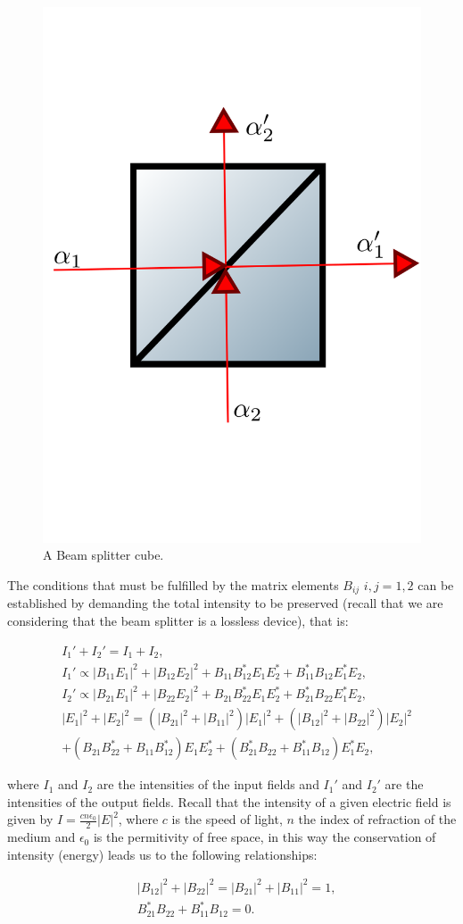 \documentclass[12pt]{book}
\begin{document}
\begin{figure}[t!]
\centering
\includegraphics[width=5 cm,height=5 cm]{images/bS.png}
\caption{A Beam splitter cube.}
\label{fig:BS}
\end{figure}

The conditions  that must be fulfilled by the matrix elements $B_{ij}$  $i,j=1,2$  can be established by demanding the total intensity to be preserved (recall that we are considering that the beam splitter is a lossless device), that is:

\begin{align}
&I_{1}'+I_{2}'=I_{1}+I_{2}, \\
&I_{1}'\propto|B_{11} E_{1}|^{2}+|B_{12} E_{2}|^{2}+B_{11} B_{12}^{*} E_{1} E_{2}^{*}+B_{11}^{*} B_{12} E_{1}^{*} E_{2}, \\
&I_{2}'\propto|B_{21} E_{1}|^{2}+|B_{22} E_{2}|^{2}+B_{21} B_{22}^{*} E_{1} E_{2}^{*}+B_{21}^{*} B_{22} E_{1}^{*} E_{2},\\
&|E_{1}|^{2}+|E_{2}|^{2}=(|B_{21}|^{2}+|B_{11}|^{2})|E_{1}|^{2}+(|B_{12}|^{2}+|B_{22}|^{2})|E_{2}|^{2}\\
&+(B_{21} B_{22}^{*}+B_{11} B_{12}^{*})E_{1} E_{2}^{*}+(B_{21}^{*} B_{22}+B_{11}^{*} B_{12})E_{1}^{*} E_{2},
\end{align}

where $I_{1}$ and $I_{2}$ are the intensities of the input fields and $I_{1}'$ and $I_{2}'$ are the intensities of the output fields. Recall that the intensity of a given electric field is given by $I=\frac{c n \epsilon_{0}}{2} |E|^{2}$, where $c$ is the speed of light, $n$ the index of refraction of the medium and $\epsilon_{0}$ is the permitivity of free space, in this way the conservation of intensity (energy) leads us to the following relationships:

\begin{align}
&|B_{12}|^{2}+|B_{22}|^{2}=|B_{21}|^{2}+|B_{11}|^{2}=1,\\
&B_{21}^{*} B_{22}+B_{11}^{*} B_{12}=0.
\end{align}
\end{document}
